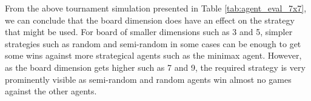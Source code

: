 From the above tournament simulation presented in Table \ref{tab:agent_eval_7x7}, we can conclude that the board dimension does have an effect on the strategy that might be used. For board of smaller dimensions such as 3 and 5, simpler strategies such as  random and semi-random in some cases can be enough to get some wins against more strategical agents such as the minimax agent. However, as the board dimension gets higher such as 7 and 9, the required strategy is very prominently visible as semi-random and random agents win almost no games against the other agents.
